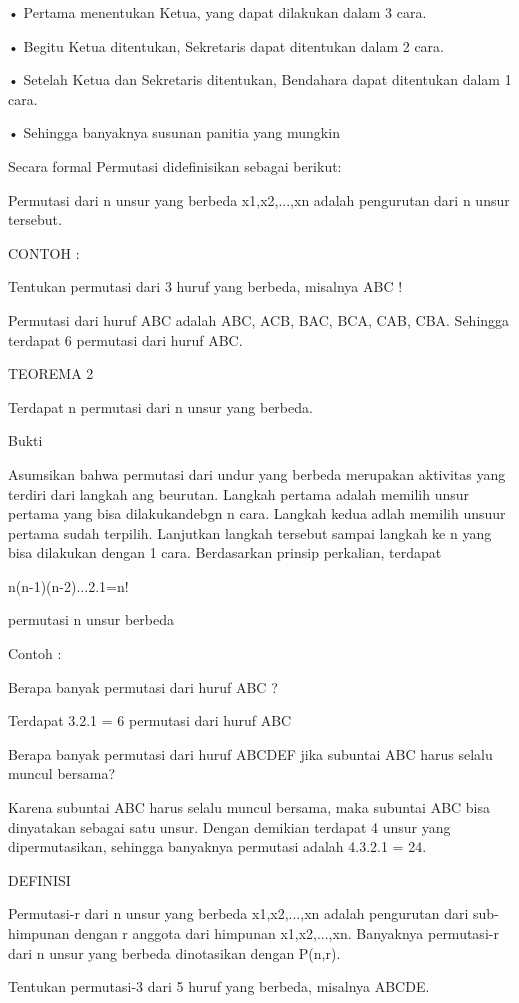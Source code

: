 \documentclass[11pt,fleqn]{book} %
\begin{document}
• Pertama menentukan Ketua, yang dapat dilakukan dalam 3 cara.


• Begitu Ketua ditentukan, Sekretaris dapat ditentukan dalam 2 cara.


• Setelah Ketua dan Sekretaris ditentukan, Bendahara dapat ditentukan dalam 1 cara.

 
• Sehingga banyaknya susunan panitia yang mungkin


Secara formal Permutasi didefinisikan sebagai berikut:


Permutasi dari n unsur yang berbeda x1,x2,...,xn adalah pengurutan dari n unsur tersebut.


CONTOH :


Tentukan permutasi dari 3 huruf yang berbeda, misalnya ABC !


Permutasi dari huruf ABC adalah ABC, ACB, BAC, BCA, CAB, CBA. Sehingga terdapat 6 permutasi dari huruf ABC.

TEOREMA 2


Terdapat n permutasi dari n unsur yang berbeda.


Bukti


Asumsikan bahwa permutasi dari undur yang berbeda merupakan aktivitas yang terdiri dari langkah ang beurutan. Langkah pertama adalah memilih unsur pertama yang bisa dilakukandebgn n cara. Langkah kedua adlah memilih unsuur pertama sudah terpilih. Lanjutkan langkah tersebut sampai langkah ke n yang bisa dilakukan dengan 1 cara. Berdasarkan prinsip perkalian, terdapat


n(n-1)(n-2)...2.1=n!


permutasi n unsur berbeda

Contoh :


Berapa banyak permutasi dari huruf ABC ?


Terdapat 3.2.1 = 6 permutasi dari huruf ABC

Berapa banyak permutasi dari huruf ABCDEF jika subuntai ABC harus selalu muncul bersama?


Karena subuntai ABC harus selalu muncul bersama, maka subuntai ABC bisa dinyatakan sebagai satu unsur. Dengan demikian terdapat 4 unsur yang dipermutasikan, sehingga banyaknya permutasi adalah 4.3.2.1 = 24.

DEFINISI


Permutasi-r dari n unsur yang berbeda x1,x2,...,xn adalah pengurutan dari sub-himpunan dengan r anggota dari himpunan {x1,x2,...,xn}. Banyaknya permutasi-r dari n unsur yang berbeda dinotasikan dengan P(n,r).

Tentukan permutasi-3 dari 5 huruf yang berbeda, misalnya ABCDE.
\end{document}
